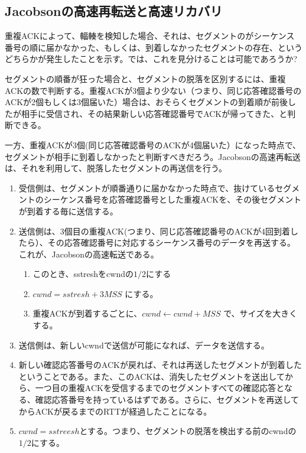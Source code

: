 \subsection{Jacobsonの高速再転送と高速リカバリ}

重複ACKによって、輻輳を検知した場合、それは、セグメントのがシーケンス番号の順に届かなかった、もしくは、到着しなかったセグメントの存在、というどちらかが発生したことを示す。では、これを見分けることは可能であろうか?

セグメントの順番が狂った場合と、セグメントの脱落を区別するには、重複ACKの数で判断する。重複ACKが3個より少ない（つまり、同じ応答確認番号の ACKが2個もしくは3個届いた）場合は、おそらくセグメントの到着順が前後したが相手に受信され、その結果新しい応答確認番号でACKが帰ってきた、と判断できる。

一方、重複ACKが3個(同じ応答確認番号のACKが4個届いた）になった時点で、セグメントが相手に到着しなかったと判断すべきだろう。Jacobsonの高速再転送は、それを利用して、脱落したセグメントの再送信を行う。

\begin{enumerate}
\item 受信側は、セグメントが順番通りに届かなかった時点で、抜けているセグメントのシーケンス番号を応答確認番号とした重複ACKを、その後セグメントが到着する毎に送信する。
\item 送信側は、3個目の重複ACK(つまり、同じ応答確認番号のACKが4回到着したら）、その応答確認番号に対応するシーケンス番号のデータを再送する。これが、Jacobsonの高速転送である。
			\begin{enumerate}
            \item このとき、sstreshをcwndの$1/2$にする
            \item $cwnd = sstresh + 3MSS$ にする。
            \item 重複ACKが到着するごとに、$cwnd ← cwnd + MSS$ で、サイズを大きくする。
            \end{enumerate}
\item 送信側は、新しいcwndで送信が可能になれば、データを送信する。
\item 新しい確認応答番号のACKが戻れば、それは再送したセグメントが到着したということである。また、このACKは、消失したセグメントを送出してから、一つ目の重複ACKを受信するまでのセグメントすべての確認応答となる、確認応答番号を持っているはずである。さらに、セグメントを再送してからACKが戻るまでのRTTが経過したことになる。
\item     $cwnd = sstreesh$とする。つまり、セグメントの脱落を検出する前のcwndの$1/2$にする。
\end{enumerate}

